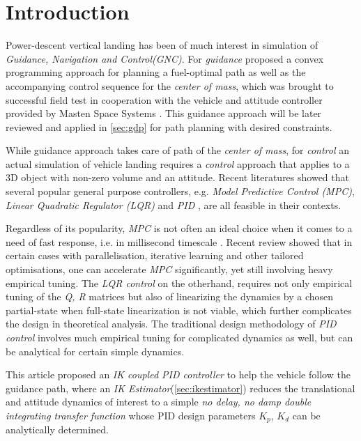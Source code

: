 \documentclass[10pt]{elsarticle}
\begin{document}
\section{Introduction} \label{sec:intro}
Power-descent vertical landing has been of much interest in simulation of \textit{Guidance, Navigation and Control(GNC)}. For \textit{guidance} \cite{cvxpow, losslesscvx} proposed a convex programming approach for planning a fuel-optimal path as well as the accompanying control sequence for the \textit{center of mass}, which was brought to successful field test in cooperation with the vehicle and attitude controller provided by Masten Space Systems \cite{gfoldexp}. This guidance approach will be later reviewed and applied in \cref{sec:gdp} for path planning with desired constraints.   

While guidance approach takes care of path of the \textit{center of mass}, for \textit{control} an actual simulation of vehicle landing requires a \textit{control} approach that applies to a 3D object with non-zero volume and an attitude. Recent literatures showed that several popular general purpose controllers, e.g. \textit {Model Predictive Control (MPC)}\cite{wang2019optimal, botelho2022design}, \textit{Linear Quadratic Regulator (LQR)}\cite{kim2020modeling} and \textit{PID} \cite{kim2020modeling, jo2011control, hilmi2019lunar}, are all feasible in their contexts. 

Regardless of its popularity, \textit{MPC} is not often an ideal choice when it comes to a need of fast response, i.e. in millisecond timescale \cite{ferreau2011model}. Recent review\cite{schwenzer2021review} showed that in certain cases with parallelisation, iterative learning and other tailored optimisations, one can accelerate \textit{MPC} significantly, yet still involving heavy empirical tuning. The \textit{LQR control} on the otherhand, requires not only empirical tuning of the \textit{Q, R} matrices but also of linearizing the dynamics by a chosen partial-state\cite{kim2020modeling} when full-state linearization is not viable, which further complicates the design in theoretical analysis\cite{sarras2008partial}. The traditional design methodology of \textit{PID control} involves much empirical tuning for complicated dynamics as well, but can be analytical for certain simple dynamics\cite{skogestad2012simc, grimholt2016optimal, ruscio2017tuning}. 

This article proposed an \textit{IK coupled PID controller} to help the vehicle follow the guidance path, where an \textit{IK Estimator}(\cref{sec:ikestimator}) reduces the translational and attitude dynamics of interest to a simple \textit{no delay, no damp double integrating transfer function} whose PID design parameters $K_{p}$, $K_{d}$ can be analytically determined.    
\end{document}
